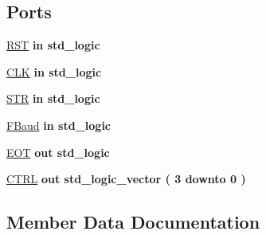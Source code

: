 \subsection*{Ports}
 \begin{DoxyCompactItemize}
\item 
\hyperlink{class_fsm_write_a98682ef7de2714e5bab788a2e2ff1b7f}{R\+S\+T}  {\bfseries {\bfseries \textcolor{keywordflow}{in}\textcolor{vhdlchar}{ }}} {\bfseries \textcolor{comment}{std\+\_\+logic}\textcolor{vhdlchar}{ }} 
\item 
\hyperlink{class_fsm_write_ab5d0ea9e968d49d94da9db07a979d402}{C\+L\+K}  {\bfseries {\bfseries \textcolor{keywordflow}{in}\textcolor{vhdlchar}{ }}} {\bfseries \textcolor{comment}{std\+\_\+logic}\textcolor{vhdlchar}{ }} 
\item 
\hyperlink{class_fsm_write_a2362aafea593a78b601ede05bb71edd7}{S\+T\+R}  {\bfseries {\bfseries \textcolor{keywordflow}{in}\textcolor{vhdlchar}{ }}} {\bfseries \textcolor{comment}{std\+\_\+logic}\textcolor{vhdlchar}{ }} 
\item 
\hyperlink{class_fsm_write_af29ebfe43178ab3fe4bfeb0538c18d1f}{F\+Baud}  {\bfseries {\bfseries \textcolor{keywordflow}{in}\textcolor{vhdlchar}{ }}} {\bfseries \textcolor{comment}{std\+\_\+logic}\textcolor{vhdlchar}{ }} 
\item 
\hyperlink{class_fsm_write_a7b083766046f96c99b2889ae0e824ca4}{E\+O\+T}  {\bfseries {\bfseries \textcolor{keywordflow}{out}\textcolor{vhdlchar}{ }}} {\bfseries \textcolor{comment}{std\+\_\+logic}\textcolor{vhdlchar}{ }} 
\item 
\hyperlink{class_fsm_write_a9473d2919b00675480ada51bb608f6c3}{C\+T\+R\+L}  {\bfseries {\bfseries \textcolor{keywordflow}{out}\textcolor{vhdlchar}{ }}} {\bfseries \textcolor{comment}{std\+\_\+logic\+\_\+vector}\textcolor{vhdlchar}{ }\textcolor{vhdlchar}{(}\textcolor{vhdlchar}{ }\textcolor{vhdlchar}{ } \textcolor{vhdldigit}{3} \textcolor{vhdlchar}{ }\textcolor{keywordflow}{downto}\textcolor{vhdlchar}{ }\textcolor{vhdlchar}{ } \textcolor{vhdldigit}{0} \textcolor{vhdlchar}{ }\textcolor{vhdlchar}{)}\textcolor{vhdlchar}{ }} 
\end{DoxyCompactItemize}


\subsection{Member Data Documentation}
\hypertarget{class_fsm_write_ab5d0ea9e968d49d94da9db07a979d402}{}
